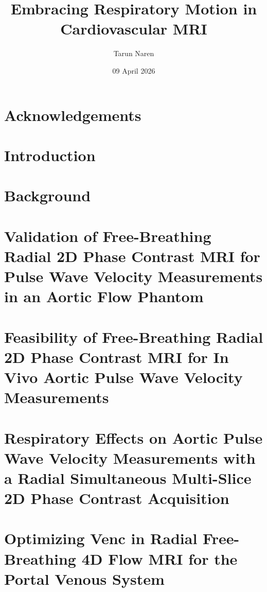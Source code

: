 \documentclass[12pt]{report}
\title{Embracing Respiratory Motion in Cardiovascular MRI}
\author{Tarun Naren}
\date{09 April 2026}
\begin{document}




\doublespacing{}
\chapter*{Acknowledgements}


\tableofcontents

\listoffigures

\listoftables

\chapter{Introduction}


\chapter{Background}\label{ch:background}


\chapter{Validation of Free-Breathing Radial 2D Phase Contrast MRI for Pulse Wave Velocity Measurements in an Aortic Flow Phantom}\label{ch:phantom}


\chapter{Feasibility of Free-Breathing Radial 2D Phase Contrast MRI for In Vivo Aortic Pulse Wave Velocity Measurements}\label{ch:life}


\chapter{Respiratory Effects on Aortic Pulse Wave Velocity Measurements with a Radial Simultaneous Multi-Slice 2D Phase Contrast Acquisition}\label{ch:respiration}


\chapter{Optimizing Venc in Radial Free-Breathing 4D Flow MRI for the Portal Venous System}\label{ch:gevenc}

\end{document}
